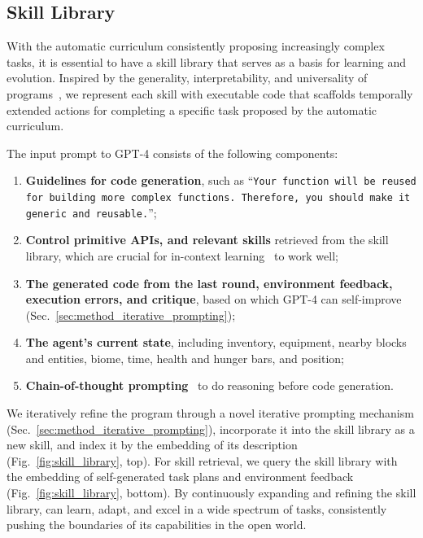 \subsection{Skill Library}
\label{sec:method_skill_library}

With the automatic curriculum consistently proposing increasingly complex tasks, it is essential to have a skill library that serves as a basis for learning and evolution. Inspired by the generality, interpretability, and universality of programs~\cite{ellis2020dreamcoder}, we represent each skill with executable code that scaffolds temporally extended actions for completing a specific task proposed by the automatic curriculum.

The input prompt to GPT-4 consists of the following components: 
\begin{enumerate}[label=(\arabic*)]
    \item \textbf{Guidelines for code generation}, such as ``\texttt{Your function will be reused for building more complex functions. Therefore, you should make it generic and reusable.}'';
    \item \textbf{Control primitive APIs, and relevant skills} retrieved from the skill library, which are crucial for in-context learning~\cite{wei2022emergent,brown2020gpt3,raffel2020t5} to work well;
    \item \textbf{The generated code from the last round, environment feedback, execution errors, and critique}, based on which GPT-4 can self-improve (Sec.~\ref{sec:method_iterative_prompting});
    \item \textbf{The agent's current state}, including inventory, equipment, nearby blocks and entities, biome, time, health and hunger bars, and position;
    \item \textbf{Chain-of-thought prompting}~\cite{wei2022chain} to do reasoning before code generation.
\end{enumerate}

We iteratively refine the program through a novel iterative prompting mechanism (Sec.~\ref{sec:method_iterative_prompting}), incorporate it into the skill library as a new skill, and index it by the embedding of its description (Fig.~\ref{fig:skill_library}, top). For skill retrieval, we query the skill library with the embedding of self-generated task plans and environment feedback (Fig.~\ref{fig:skill_library}, bottom). By continuously expanding and refining the skill library, \voyager can learn, adapt, and excel in a wide spectrum of tasks, consistently pushing the boundaries of its capabilities in the open world.

